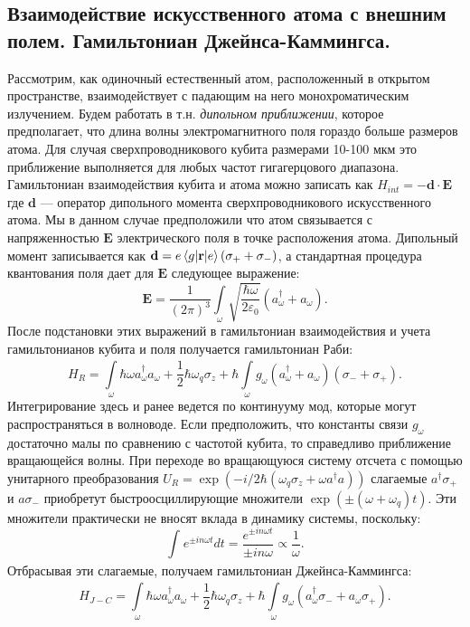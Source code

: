 \subsection{Взаимодействие искусственного атома с внешним полем. Гамильтониан Джейнса-Каммингса.}
Рассмотрим, как одиночный естественный атом, расположенный в открытом пространстве, взаимодействует с падающим на него монохроматическим излучением. Будем работать в т.н. \textit{дипольном приближении}, которое предполагает, что длина волны электромагнитного поля гораздо больше размеров атома. Для случая сверхпроводникового кубита размерами 10-100 мкм это приближение выполняется для любых частот гигагерцового диапазона. Гамильтониан взаимодействия кубита и атома можно записать как $H_{int} = - \mathbf{d}\cdot\mathbf{E}$
где $\mathbf{d}$ --- оператор дипольного момента сверхпроводникового искусственного атома. Мы в данном случае предположили что атом связывается с напряженностью $\mathbf{E}$ электрического поля в точке расположения атома. Дипольный момент записывается как $\mathbf{d} = e \braket{g|\mathbf{r}|e}(\sigma_+ + \sigma_-)$, 
а стандартная процедура квантования поля дает для $\mathbf{E}$ следующее выражение: $$\mathbf{E} = \frac{1}{(2\pi)^3}\int\limits_{\omega}^{}\sqrt{\frac{\hbar\omega}{2\varepsilon_0}} \left(a_\omega^\dag+a_\omega\right).$$
После подстановки этих выражений в гамильтониан взаимодействия и учета гамильтонианов кубита и поля получается гамильтониан Раби:
\begin{equation}
H_R = \int\limits_{\omega}^{}\hbar \omega a^\dag_\omega a_\omega + \frac{1}{2}\hbar \omega_q\sigma_z + \hbar\int\limits_{\omega}^{}g_{\omega}(a_\omega^\dag + a_\omega)(\sigma_-+\sigma_+).
\end{equation}
Интегрирование здесь и ранее ведется по континууму мод, которые могут распространяться в волноводе. Если предположить, что константы связи $g_\omega$ достаточно малы по сравнению с частотой кубита, то справедливо приближение вращающейся волны. При переходе во вращающуюся систему отсчета с помощью унитарного преобразования $U_R =\exp\left({-i/2\hbar}(\omega_q\sigma_z+\omega a^\dag a)\right) $ слагаемые $a^\dagger\sigma_+$ и $a\sigma_-$ приобретут быстроосциллирующие множители $\exp\left( \pm(\omega+\omega_q)t\right)$. Эти множители практически не вносят вклада в динамику системы, поскольку:
$$\int_{}^{}e^{\pm in \omega t} dt=\frac{e^{\pm in \omega t}}{\pm in\omega}\propto \frac{1}{\omega}.$$
Отбрасывая эти слагаемые, получаем гамильтониан Джейнса-Каммингса:
\begin{equation}
H_{J-C} = \int\limits_{\omega}^{}\hbar \omega a^\dag_\omega a_\omega + \frac{1}{2}\hbar \omega_q\sigma_z + \hbar\int\limits_{\omega}^{}g_{\omega}(a_\omega^\dag\sigma_- + a_\omega\sigma_+).
\end{equation}
